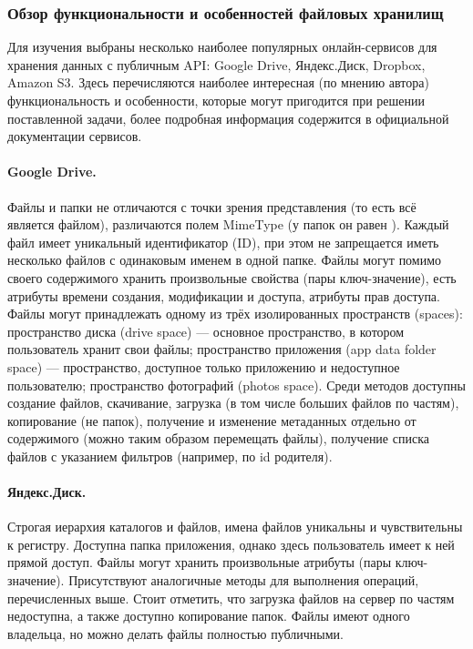   \subsubsection{Обзор функциональности и особенностей файловых хранилищ}\label{filesystems-overview}
    Для изучения выбраны несколько наиболее популярных онлайн-сервисов для хранения данных с публичным API: Google Drive, Яндекс.Диск, Dropbox, Amazon S3. Здесь перечисляются наиболее интересная (по мнению автора) функциональность и особенности, которые могут пригодится при решении поставленной задачи, более подробная информация содержится в официальной документации сервисов.
    
    \paragraph{Google Drive\cite{gdrive-about-files}.} 
      Файлы и папки не отличаются с точки зрения представления (то есть всё является файлом), различаются полем MimeType (у папок он равен ). Каждый файл имеет уникальный идентификатор (ID), при этом не запрещается иметь несколько файлов с одинаковым именем в одной папке. Файлы могут помимо своего содержимого хранить произвольные свойства (пары ключ-значение), есть атрибуты времени создания, модификации и доступа, атрибуты прав доступа. Файлы могут принадлежать одному из трёх изолированных пространств (spaces): пространство диска (drive space) --- основное пространство, в котором пользователь хранит свои файлы; пространство приложения (app data folder space) --- пространство, доступное только приложению и недоступное пользователю; пространство фотографий (photos space). Среди методов доступны создание файлов, скачивание, загрузка (в том числе больших файлов по частям), копирование (не папок), получение и изменение метаданных отдельно от содержимого (можно таким образом перемещать файлы), получение списка файлов с указанием фильтров (например, по id родителя).

    \paragraph{Яндекс.Диск\cite{yadisk-docs}.} Строгая иерархия каталогов и файлов, имена файлов уникальны и чувствительны к регистру. Доступна папка приложения, однако здесь пользователь имеет к ней прямой доступ. Файлы могут хранить произвольные атрибуты (пары ключ-значение). Присутствуют аналогичные методы для выполнения операций, перечисленных выше. Стоит отметить, что загрузка файлов на сервер по частям недоступна, а также доступно копирование папок. Файлы имеют одного владельца, но можно делать файлы полностью публичными.

